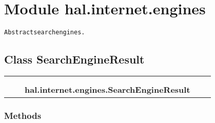 %
%
%


\section{Module hal.internet.engines}

    \label{hal:internet:engines}
\begin{alltt}
Abstract search engines. 
\end{alltt}



\subsection{Class SearchEngineResult}

    \label{hal:internet:engines:SearchEngineResult}
\begin{tabular}{cccccc}
\multicolumn{2}{r}{\settowidth{\BCL}{object}\multirow{2}{\BCL}{object}}
&&
  \\\cline{3-3}
  &&\multicolumn{1}{c|}{}
&&
  \\
&&\multicolumn{2}{l}{\textbf{hal.internet.engines.SearchEngineResult}}
\end{tabular}



  \subsubsection{Methods}

